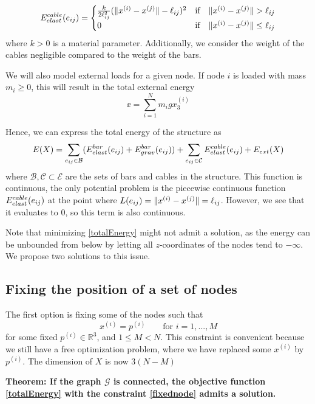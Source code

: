 \begin{equation}
E^{cable}_{elast}(e_{ij}) = \begin{cases}
    \frac{k}{2\ell_{ij}^2}(\lVert x^{(i)} - x^{(j)}\rVert-\ell_{ij})^2 & \text{if} \quad \lVert x^{(i)} - x^{(j)}\rVert >\ell_{ij}\\
    0 & \text{if} \quad \lVert x^{(i)} - x^{(j)}\rVert \leq \ell_{ij}
    \end{cases}
    \label{cableElast}
\end{equation}
where $k > 0$ is a material parameter. Additionally, we consider the weight of the cables negligible compared to the weight of the bars.

We will also model external loads for a given node. If node $i$ is loaded with mass $m_i \geq 0$, this will result in the total external energy
\begin{equation}
    \ee = \sum_{i=1}^{N} m_i g x_3^{(i)}
    \label{externalEnergy}
\end{equation}

Hence, we can express the total energy of the structure as \begin{equation}
    E(X) = \sum\limits_{e_{ij} \in \mathcal{B}}(E^{bar}_{elast}(e_{ij}) + E^{bar}_{grav}(e_{ij})) + \sum\limits_{e_{ij} \in \mathcal{C}} E^{cable}_{elast}(e_{ij}) + E_{ext}(X)
    \label{totalEnergy}
\end{equation} where $\mathcal{B}, \mathcal{C} \subset \mathcal{E}$ are the sets of bars and cables in the structure. This function is continuous, the only potential problem is the piecewise continuous function $E^{cable}_{elast}(e_{ij})$ at the point where $L(e_{ij}) = \lVert x^{(i)} - x^{(j)}\rVert = \ell_{ij}$. However, we see that it evaluates to $0$, so this term is also continuous.

Note that minimizing \eqref{totalEnergy} might not admit a solution, as the energy can be unbounded from below by letting all $z$-coordinates of the nodes tend to $-\infty$. We propose two solutions to this issue.

\subsection{Fixing the position of a set of nodes}
The first option is fixing some of the nodes such that
\begin{equation}
    x^{(i)} = p^{(i)} \qquad \text{for } i = 1,...,M
    \label{fixednode}
\end{equation} for some fixed $p^{(i)} \in \mathbb{R}^3$, and $1\leq M < N$. This constraint is convenient because we still have a free optimization problem, where we have replaced some $x^{(i)}$ by $p^{(i)}$. The dimension of $X$ is now $3(N-M)$

\textbf{Theorem: If the graph $\mathcal{G}$ is connected, the objective function \eqref{totalEnergy} with the constraint \eqref{fixednode} admits a solution.}

